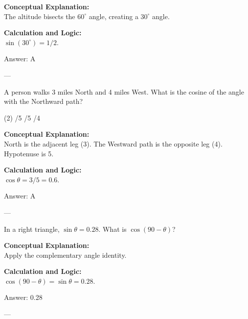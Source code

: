 \documentclass[11pt,paper=a4,answers]{exam}
\begin{document}
\begin{questions}
\begin{solution}
\textbf{Conceptual Explanation:} \\
The altitude bisects the $60^\circ$ angle, creating a $30^\circ$ angle.

\vspace{10pt}
\textbf{Calculation and Logic:} \\
$\sin(30^\circ) = 1/2$.

\vspace{15pt}
Answer: \colorbox{yellow!100}{A}
\end{solution}

---

\question
A person walks 3 miles North and 4 miles West. What is the cosine of the angle with the Northward path?
\begin{tasks}(2)
    /5
    /5
    /4
\end{tasks}

\begin{solution}
\textbf{Conceptual Explanation:} \\
North is the adjacent leg (3). The Westward path is the opposite leg (4). Hypotenuse is 5.

\vspace{10pt}
\textbf{Calculation and Logic:} \\
$\cos \theta = 3/5 = 0.6$.

\vspace{15pt}
Answer: \colorbox{yellow!100}{A}
\end{solution}

---

\question
In a right triangle, $\sin \theta = 0.28$. What is $\cos(90 - \theta)$?

\begin{solution}
\textbf{Conceptual Explanation:} \\
Apply the complementary angle identity.

\vspace{10pt}
\textbf{Calculation and Logic:} \\
$\cos(90 - \theta) = \sin \theta = 0.28$.

\vspace{15pt}
Answer: \colorbox{yellow!100}{0.28}
\end{solution}

---


\end{questions}
\end{document}
